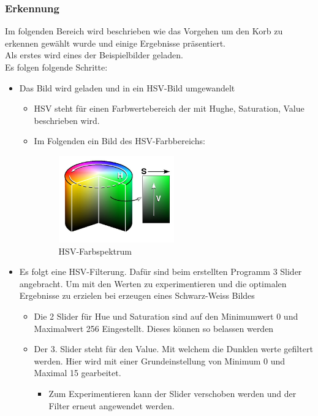 \subsubsection{Erkennung}
Im folgenden Bereich wird beschrieben wie das Vorgehen um den Korb zu erkennen 
gewählt wurde und einige Ergebnisse präsentiert.\\
%
Als erstes wird eines der Beispielbilder geladen.\\
%
Es folgen folgende Schritte:\\
%
\begin{itemize}
<<<<<<< HEAD
	\item Das Bild wird geladen und in ein HSV-Bild umgewandelt
	\begin{itemize}
		\item HSV steht für einen Farbwertebereich der mit Hughe, Saturation, Value beschrieben wird.
		\item Im Folgenden ein Bild des HSV-Farbbereichs:\\
		\begin{figure}[h!]
			\centering
			\includegraphics[width=0.5\textwidth]{fig/HSV_cylinder.jpg}
			\caption{HSV-Farbspektrum}
			\label{fig:HSV-Farbspektrum}
		\end{figure}
	\end{itemize}
	\item Es folgt eine HSV-Filterung. Dafür sind beim erstellten Programm 3 Slider angebracht. Um mit den Werten zu experimentieren und die optimalen Ergebnisse zu erzielen bei erzeugen eines Schwarz-Weiss Bildes
	\begin{itemize}
		\item Die 2 Slider für Hue und Saturation sind auf den Minimumwert 0 und Maximalwert 256 Eingestellt. Dieses können so belassen werden
		\item Der 3. Slider steht für den Value. Mit welchem die Dunklen werte gefiltert werden. Hier wird mit einer Grundeinstellung von Minimum 0 und Maximal 15 gearbeitet.
		\begin{itemize}
			\item Zum Experimentieren kann der Slider verschoben werden und der Filter erneut angewendet werden.

\end{itemize}
\end{itemize}
\end{itemize}
